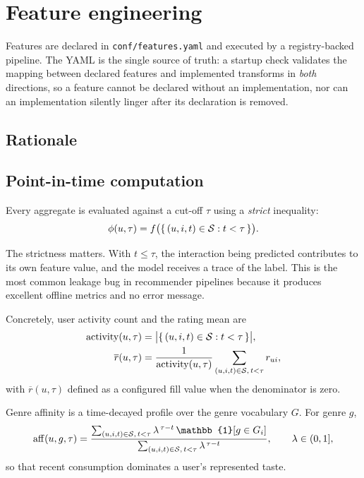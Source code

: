 \section{Feature engineering}
\label{sec:features}

Features are declared in \texttt{conf/features.yaml} and executed by a
registry-backed pipeline. The YAML is the single source of truth: a startup
check validates the mapping between declared features and implemented
transforms in \emph{both} directions, so a feature cannot be declared without
an implementation, nor can an implementation silently linger after its
declaration is removed.



\subsection{Rationale}



\subsection{Point-in-time computation}

Every aggregate is evaluated against a cut-off $\tau$ using a \emph{strict}
inequality:
\begin{equation}
  \phi(u, \tau) = f\big(\{\, (u,i,t) \in \mathcal{S} : t < \tau \,\}\big) .
  \label{eq:pit}
\end{equation}

The strictness matters. With $t \leq \tau$, the interaction being predicted
contributes to its own feature value, and the model receives a trace of the
label. This is the most common leakage bug in recommender pipelines because
it produces excellent offline metrics and no error message.

Concretely, user activity count and the rating mean are
\begin{align}
  \mathrm{activity}(u,\tau) &= \big|\{\, (u,i,t) \in \mathcal{S} : t < \tau \,\}\big| ,\\
  \overline{r}(u,\tau)      &= \frac{1}{\mathrm{activity}(u,\tau)}
                               \sum_{(u,i,t) \in \mathcal{S},\, t < \tau} r_{ui} ,
\end{align}
with $\overline{r}(u,\tau)$ defined as a configured fill value when the
denominator is zero.

Genre affinity is a time-decayed profile over the genre vocabulary $G$. For
genre $g$,
\begin{equation}
  \mathrm{aff}(u, g, \tau)
  = \frac{\sum_{(u,i,t) \in \Rset,\, t<\tau} \lambda^{\,\tau - t}\, \mathbb{1}[g \in G_i]}
         {\sum_{(u,i,t) \in \Rset,\, t<\tau} \lambda^{\,\tau - t}} ,
  \qquad \lambda \in (0, 1] ,
  \label{eq:affinity}
\end{equation}
so that recent consumption dominates a user's represented taste.

